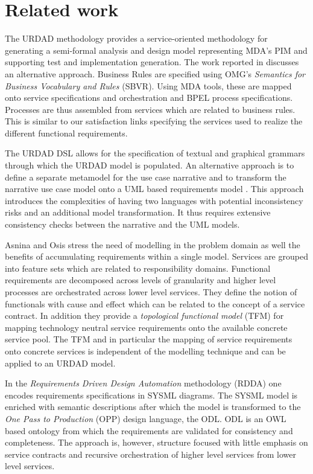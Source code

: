 \section{Related work}
\label{sec:relatedWork}
The URDAD methodology provides a service-oriented methodology for generating a semi-formal analysis and design model representing MDA's PIM and supporting test and implementation generation. The work reported in \cite{iacob_model-driven_2008} discusses an alternative approach. Business Rules are specified using OMG's {\em Semantics for Business Vocabulary and Rules} (SBVR). Using MDA tools, these are mapped onto service specifications and orchestration and BPEL process specifications. Processes are thus assembled from services which are related to business rules. This is similar to our satisfaction links specifying the services used to realize the different functional requirements.

The URDAD DSL allows for the specification of textual and graphical grammars through which the URDAD model is populated. An alternative approach is to define a separate metamodel for the use case narrative and to transform the narrative use case model onto a UML based requirements model \cite{hoffmann_towards_2009,osis_transforming_2010}. This approach introduces the complexities of having two languages with potential inconsistency risks and an additional model transformation. It thus requires extensive consistency checks between the narrative and the UML models.

Asnina and Osis\cite{asnina_computation_2010} stress the need of modelling in the problem domain as well the benefits of accumulating requirements within a single model. Services are grouped into feature sets which are related to responsibility domains. Functional requirements are decomposed across levels of granularity and higher level processes are orchestrated across lower level services. They define the notion of functionals with cause and effect which can be related to the concept of a service contract. In addition they provide a {\em topological functional model} (TFM) for mapping technology neutral service requirements onto the available concrete service pool. The TFM and in particular the mapping of service requirements onto concrete services is independent of the modelling technique and can be applied to an URDAD model. 

In the {\em Requirements Driven Design Automation} methodology (RDDA) \cite{cardei_model_2008} one encodes requirements specifications in SYSML diagrams. The SYSML model is enriched with semantic descriptions after which the model is transformed to the {\em One Pass to Production} (OPP) design language, the ODL. ODL is an OWL based ontology from which the requirements are validated for consistency and completeness. The approach is, however, structure focused with little emphasis on service contracts and recursive orchestration of higher level services from lower level services.

